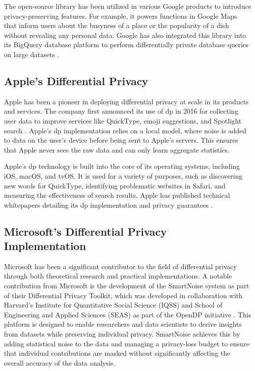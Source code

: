 The open-source library has been utilized in various Google products to introduce privacy-preserving features. For example, it powers functions in Google Maps that inform users about the busyness of a place or the popularity of a dish without revealing any personal data. Google has also integrated this library into its BigQuery database platform to perform differentially private database queries on large datasets \cite{Google_BigQuery}.

\subsection{Apple's Differential Privacy}

Apple has been a pioneer in deploying differential privacy at scale in its products and services. The company first announced its use of \acrshort{dp} in 2016 for collecting user data to improve services like QuickType, emoji suggestions, and Spotlight search \cite{tang2017privacy, AppleDifferentialPrivacy2017}. Apple's \acrshort{dp} implementation relies on a local model, where noise is added to data on the user's device before being sent to Apple's servers. This ensures that Apple never sees the raw data and can only learn aggregate statistics.

Apple's \acrshort{dp} technology is built into the core of its operating systems, including iOS, macOS, and tvOS. It is used for a variety of purposes, such as discovering new words for QuickType, identifying problematic websites in Safari, and measuring the effectiveness of search results. Apple has published technical whitepapers detailing its \acrshort{dp} implementation and privacy guarantees \cite{AppleDifferentialPrivacy2017}.

\subsection{Microsoft's Differential Privacy Implementation}

Microsoft has been a significant contributor to the field of differential privacy through both theoretical research and practical implementations. A notable contribution from Microsoft is the development of the SmartNoise system as part of their Differential Privacy Toolkit, which was developed in collaboration with Harvard's Institute for Quantitative Social Science (IQSS) and School of Engineering and Applied Sciences (SEAS) as part of the OpenDP initiative \cite{MicrosoftOpenDP, MicrosoftHarvardOpenDP}. This platform is designed to enable researchers and data scientists to derive insights from datasets while preserving individual privacy. SmartNoise achieves this by adding statistical noise to the data and managing a privacy-loss budget to ensure that individual contributions are masked without significantly affecting the overall accuracy of the data analysis.

